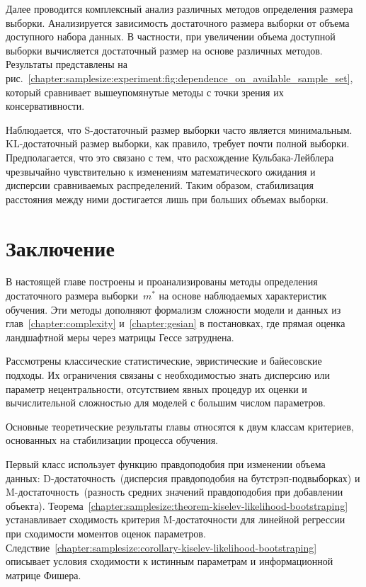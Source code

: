 Далее проводится комплексный анализ различных методов определения размера выборки.
Анализируется зависимость достаточного размера выборки от объема доступного набора данных.
В частности, при увеличении объема доступной выборки вычисляется достаточный размер на основе различных методов.
Результаты представлены на рис.~\ref{chapter:samplesize:experiment:fig:dependence_on_available_sample_set}, который сравнивает вышеупомянутые методы с точки зрения их консервативности.

Наблюдается, что S-достаточный размер выборки часто является минимальным.
KL-достаточный размер выборки, как правило, требует почти полной выборки.
Предполагается, что это связано с тем, что расхождение Кульбака-Лейблера чрезвычайно чувствительно к изменениям математического ожидания и дисперсии сравниваемых распределений.
Таким образом, стабилизация расстояния между ними достигается лишь при больших объемах выборки.

\section{Заключение}

В настоящей главе построены и проанализированы методы определения достаточного размера выборки~$m^*$ на основе наблюдаемых характеристик обучения. Эти методы дополняют формализм сложности модели и данных из глав~\ref{chapter:complexity} и~\ref{chapter:gesian} в постановках, где прямая оценка ландшафтной меры через матрицы Гессе затруднена.

Рассмотрены классические статистические, эвристические и байесовские подходы. Их ограничения связаны с необходимостью знать дисперсию или параметр нецентральности, отсутствием явных процедур их оценки и вычислительной сложностью для моделей с большим числом параметров.

Основные теоретические результаты главы относятся к двум классам критериев, основанных на стабилизации процесса обучения.

Первый класс использует функцию правдоподобия при изменении объема данных: D-достаточность~(дисперсия правдоподобия на бутстрэп-подвыборках) и M-достаточность~(разность средних значений правдоподобия при добавлении объекта). Теорема~\ref{chapter:samplesize:theorem-kiselev-likelihood-bootstraping} устанавливает сходимость критерия M-достаточности для линейной регрессии при сходимости моментов оценок параметров. Следствие~\ref{chapter:samplesize:corollary-kiselev-likelihood-bootstraping} описывает условия сходимости к истинным параметрам и информационной матрице Фишера.

